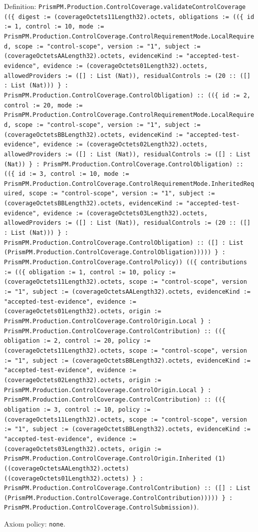 \documentclass[11pt]{article}
\begin{document}
\noindent Definition: \texttt{PrismPM.Production.ControlCoverage.validateControlCoverage ((\{ digest := (coverageOctets11Length32).octets, obligations := ((\{ id := 1, control := 10, mode := PrismPM.Production.ControlCoverage.ControlRequirementMode.LocalRequired, scope := "control-scope", version := "1", subject := (coverageOctetsAALength32).octets, evidenceKind := "accepted-test-evidence", evidence := (coverageOctets01Length32).octets, allowedProviders := ([] : List (Nat)), residualControls := (20 :: ([] : List (Nat))) \} : PrismPM.Production.ControlCoverage.ControlObligation) :: ((\{ id := 2, control := 20, mode := PrismPM.Production.ControlCoverage.ControlRequirementMode.LocalRequired, scope := "control-scope", version := "1", subject := (coverageOctetsBBLength32).octets, evidenceKind := "accepted-test-evidence", evidence := (coverageOctets02Length32).octets, allowedProviders := ([] : List (Nat)), residualControls := ([] : List (Nat)) \} : PrismPM.Production.ControlCoverage.ControlObligation) :: ((\{ id := 3, control := 10, mode := PrismPM.Production.ControlCoverage.ControlRequirementMode.InheritedRequired, scope := "control-scope", version := "1", subject := (coverageOctetsBBLength32).octets, evidenceKind := "accepted-test-evidence", evidence := (coverageOctets03Length32).octets, allowedProviders := ([] : List (Nat)), residualControls := (20 :: ([] : List (Nat))) \} : PrismPM.Production.ControlCoverage.ControlObligation) :: ([] : List (PrismPM.Production.ControlCoverage.ControlObligation))))) \} : PrismPM.Production.ControlCoverage.ControlPolicy)) ((\{ contributions := ((\{ obligation := 1, control := 10, policy := (coverageOctets11Length32).octets, scope := "control-scope", version := "1", subject := (coverageOctetsAALength32).octets, evidenceKind := "accepted-test-evidence", evidence := (coverageOctets01Length32).octets, origin := PrismPM.Production.ControlCoverage.ControlOrigin.Local \} : PrismPM.Production.ControlCoverage.ControlContribution) :: ((\{ obligation := 2, control := 20, policy := (coverageOctets11Length32).octets, scope := "control-scope", version := "1", subject := (coverageOctetsBBLength32).octets, evidenceKind := "accepted-test-evidence", evidence := (coverageOctets02Length32).octets, origin := PrismPM.Production.ControlCoverage.ControlOrigin.Local \} : PrismPM.Production.ControlCoverage.ControlContribution) :: ((\{ obligation := 3, control := 10, policy := (coverageOctets11Length32).octets, scope := "control-scope", version := "1", subject := (coverageOctetsBBLength32).octets, evidenceKind := "accepted-test-evidence", evidence := (coverageOctets03Length32).octets, origin := PrismPM.Production.ControlCoverage.ControlOrigin.Inherited (1) ((coverageOctetsAALength32).octets) ((coverageOctets01Length32).octets) \} : PrismPM.Production.ControlCoverage.ControlContribution) :: ([] : List (PrismPM.Production.ControlCoverage.ControlContribution))))) \} : PrismPM.Production.ControlCoverage.ControlSubmission))}.\par
\noindent Axiom policy: \texttt{none}.\par
\end{document}
